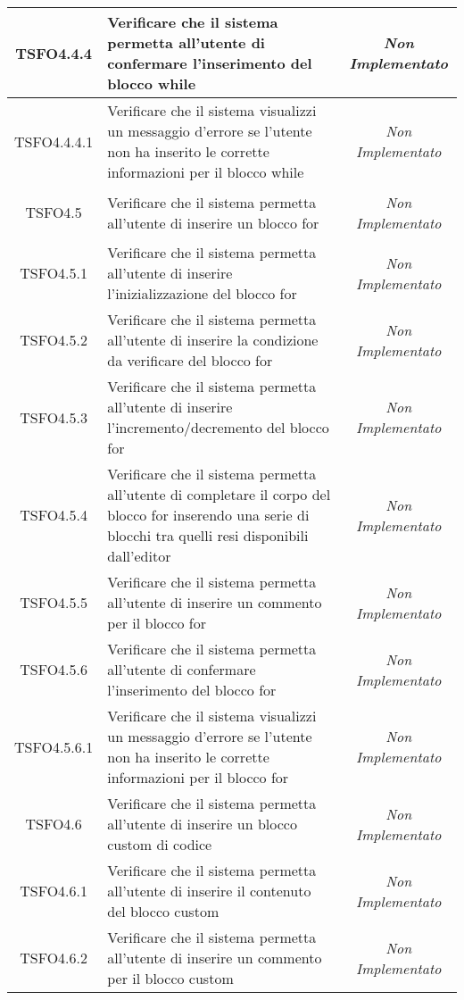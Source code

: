 \begin{longtable}{|c|>{}m{8cm}|c|}
\hypertarget{TSFO4.4.4}{TSFO4.4.4} & Verificare che il sistema permetta all'utente di confermare l'inserimento del blocco while & \textit{Non Implementato}\\ \hline
\hypertarget{TSFO4.4.4.1}{TSFO4.4.4.1} & Verificare che il sistema visualizzi un messaggio d'errore se l'utente non ha inserito le corrette informazioni per il blocco while & \textit{Non Implementato}\\ \hline
\hypertarget{TSFO4.5}{TSFO4.5} & Verificare che il sistema permetta all'utente di inserire un blocco for & \textit{Non Implementato}\\ \hline
\hypertarget{TSFO4.5.1}{TSFO4.5.1} & Verificare che il sistema permetta all'utente di inserire l'inizializzazione del blocco for & \textit{Non Implementato}\\ \hline
\hypertarget{TSFO4.5.2}{TSFO4.5.2} & Verificare che il sistema permetta all'utente di inserire la condizione da verificare del blocco for & \textit{Non Implementato}\\ \hline
\hypertarget{TSFO4.5.3}{TSFO4.5.3} & Verificare che il sistema permetta all'utente di inserire l'incremento/decremento del blocco for & \textit{Non Implementato}\\ \hline
\hypertarget{TSFO4.5.4}{TSFO4.5.4} & Verificare che il sistema permetta all'utente di completare il corpo del blocco for inserendo una serie di blocchi tra quelli resi disponibili dall'editor & \textit{Non Implementato}\\ \hline
\hypertarget{TSFO4.5.5}{TSFO4.5.5} & Verificare che il sistema permetta all'utente di inserire un commento per il blocco for & \textit{Non Implementato}\\ \hline
\hypertarget{TSFO4.5.6}{TSFO4.5.6} & Verificare che il sistema permetta all'utente di confermare l'inserimento del blocco for & \textit{Non Implementato}\\ \hline
\hypertarget{TSFO4.5.6.1}{TSFO4.5.6.1} & Verificare che il sistema visualizzi un messaggio d'errore se l'utente non ha inserito le corrette informazioni per il blocco for & \textit{Non Implementato}\\ \hline
\hypertarget{TSFO4.6}{TSFO4.6} & Verificare che il sistema permetta all'utente di inserire un blocco custom di codice & \textit{Non Implementato}\\ \hline
\hypertarget{TSFO4.6.1}{TSFO4.6.1} & Verificare che il sistema permetta all'utente di inserire il contenuto del blocco custom & \textit{Non Implementato}\\ \hline
\hypertarget{TSFO4.6.2}{TSFO4.6.2} & Verificare che il sistema permetta all'utente di inserire un commento per il blocco custom & \textit{Non Implementato}\\ \hline

\end{longtable}
